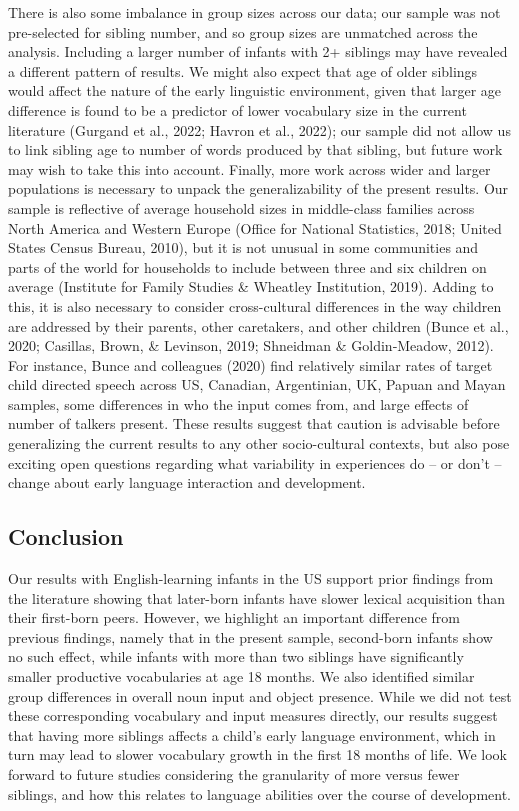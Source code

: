 \documentclass[
  man,floatsintext]{apa6}
\begin{document}
There is also some imbalance in group sizes across our data; our sample was not pre-selected for sibling number, and so group sizes are unmatched across the analysis. Including a larger number of infants with 2+ siblings may have revealed a different pattern of results. We might also expect that age of older siblings would affect the nature of the early linguistic environment, given that larger age difference is found to be a predictor of lower vocabulary size in the current literature (Gurgand et al., 2022; Havron et al., 2022); our sample did not allow us to link sibling age to number of words produced by that sibling, but future work may wish to take this into account. Finally, more work across wider and larger populations is necessary to unpack the generalizability of the present results. Our sample is reflective of average household sizes in middle-class families across North America and Western Europe (Office for National Statistics, 2018; United States Census Bureau, 2010), but it is not unusual in some communities and parts of the world for households to include between three and six children on average (Institute for Family Studies \& Wheatley Institution, 2019). Adding to this, it is also necessary to consider cross-cultural differences in the way children are addressed by their parents, other caretakers, and other children (Bunce et al., 2020; Casillas, Brown, \& Levinson, 2019; Shneidman \& Goldin‐Meadow, 2012). For instance, Bunce and colleagues (2020) find relatively similar rates of target child directed speech across US, Canadian, Argentinian, UK, Papuan and Mayan samples, some differences in who the input comes from, and large effects of number of talkers present. These results suggest that caution is advisable before generalizing the current results to any other socio-cultural contexts, but also pose exciting open questions regarding what variability in experiences do -- or don't -- change about early language interaction and development.

\hypertarget{conclusion}{%
\subsection{Conclusion}\label{conclusion}}

Our results with English-learning infants in the US support prior findings from the literature showing that later-born infants have slower lexical acquisition than their first-born peers. However, we highlight an important difference from previous findings, namely that in the present sample, second-born infants show no such effect, while infants with more than two siblings have significantly smaller productive vocabularies at age 18 months. We also identified similar group differences in overall noun input and object presence. While we did not test these corresponding vocabulary and input measures directly, our results suggest that having more siblings affects a child's early language environment, which in turn may lead to slower vocabulary growth in the first 18 months of life. We look forward to future studies considering the granularity of more versus fewer siblings, and how this relates to language abilities over the course of development.
\end{document}
